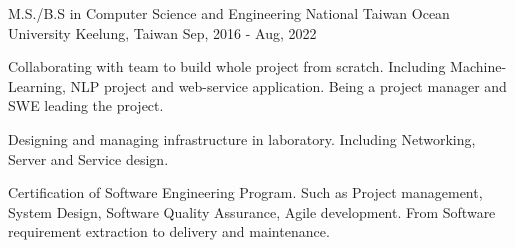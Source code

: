 

\begin{cventries}

  \cventry
    {M.S./B.S in Computer Science and Engineering} %
    {National Taiwan Ocean University} %
    {Keelung, Taiwan} %
    {Sep, 2016 - Aug, 2022} %
    {
      \begin{cvitems} %
        \item {Collaborating with team to build whole project from scratch. Including Machine-Learning, NLP project and web-service application. Being a project manager and SWE leading the project.}
        \item {Designing and managing infrastructure in laboratory. Including Networking, Server and Service design.}
        \item {Certification of Software Engineering Program. Such as Project management, System Design, Software Quality Assurance, Agile development. From Software requirement extraction to delivery and maintenance.}
      \end{cvitems}
    }


\end{cventries}
